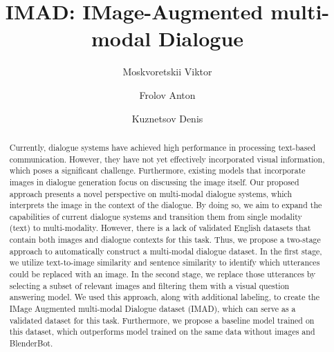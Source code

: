 \documentclass[runningheads]{llncs}
\begin{document}
%
\title{IMAD: IMage-Augmented multi-modal Dialogue}
%
%
\author{Moskvoretskii Viktor \and
Frolov Anton \and
Kuznetsov Denis}
%
%

%
\maketitle              %
%
\begin{abstract}
  Currently, dialogue systems have achieved high performance in processing text-based communication. However, they have not yet effectively incorporated visual information, which poses a significant challenge. Furthermore, existing models that incorporate images in dialogue generation focus on discussing the image itself. Our proposed approach presents a novel perspective on multi-modal dialogue systems, which interprets the image in the context of the dialogue. By doing so, we aim to expand the capabilities of current dialogue systems and transition them from single modality (text) to multi-modality. However, there is a lack of validated English datasets that contain both images and dialogue contexts for this task. Thus, we propose a two-stage approach to automatically construct a multi-modal dialogue dataset. In the first stage, we utilize text-to-image similarity and sentence similarity to identify which utterances could be replaced with an image. In the second stage, we replace those utterances by selecting a subset of relevant images and filtering them with a visual question answering model. We used this approach, along with additional labeling, to create the IMage Augmented multi-modal Dialogue dataset (IMAD), which can serve as a validated dataset for this task. Furthermore, we propose a baseline model trained on this dataset, which outperforms model trained on the same data without images and BlenderBot.

\end{abstract}
%
%
%
\end{document}

